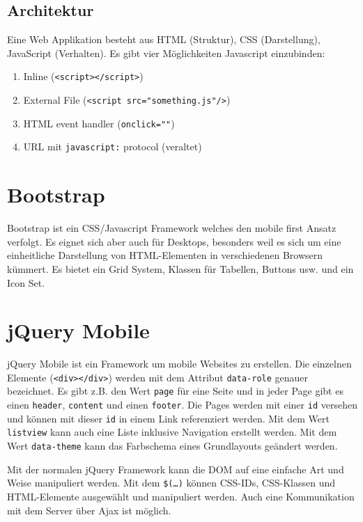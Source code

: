 \subsection{Architektur}

Eine Web Applikation besteht aus HTML (Struktur), CSS (Darstellung), JavaScript (Verhalten). Es gibt vier Möglichkeiten Javascript einzubinden:
\begin{enumerate}
	\item Inline (\texttt{<script></script>})
	\item External File (\texttt{<script src="something.js"/>})
	\item HTML event handler (\texttt{onclick=""})
	\item URL mit \texttt{javascript:} protocol (veraltet)
\end{enumerate}

\section{Bootstrap}

Bootstrap ist ein CSS/Javascript Framework welches den mobile first Ansatz verfolgt. Es eignet sich aber auch für Desktops, besonders weil es sich um eine einheitliche Darstellung von HTML-Elementen in verschiedenen Browsern kümmert. Es bietet ein Grid System, Klassen für Tabellen, Buttons usw. und ein Icon Set.

\section{jQuery Mobile}

jQuery Mobile ist ein Framework um mobile Websites zu erstellen. Die einzelnen Elemente (\texttt{<div></div>}) werden mit dem Attribut \texttt{data-role} genauer bezeichnet. Es gibt z.B. den Wert \texttt{page} für eine Seite und in jeder Page gibt es einen \texttt{header}, \texttt{content} und einen \texttt{footer}. Die Pages werden mit einer \texttt{id} versehen und können mit dieser \texttt{id} in einem Link referenziert werden. Mit dem Wert \texttt{listview} kann auch eine Liste inklusive Navigation erstellt werden. Mit dem Wert \texttt{data-theme} kann das Farbschema eines Grundlayouts geändert werden.

Mit der normalen jQuery Framework kann die DOM auf eine einfache Art und Weise manipuliert werden. Mit dem \texttt{\$(\dots)} können CSS-IDs, CSS-Klassen und HTML-Elemente ausgewählt und manipuliert werden. Auch eine Kommunikation mit dem Server über Ajax ist möglich. 


